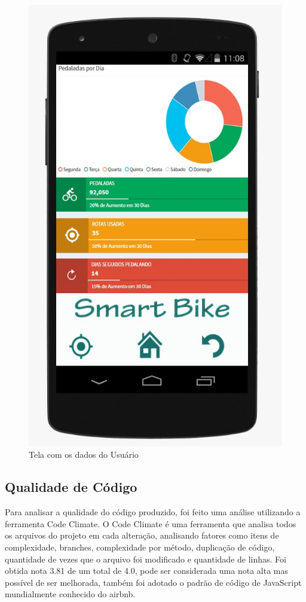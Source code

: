 	\graphicspath{{figuras/}}
	\begin{figure}[!htb]
	\centering
	\includegraphics[scale=0.40]{dashboard.jpeg}
	\caption{Tela com os dados do Usuário}
	\label{img:dados}
	\end{figure}
	
	\subsection{Qualidade de Código}
	Para analisar a qualidade do código produzido, foi feito uma análise utilizando a ferramenta Code Climate.
	O Code Climate é uma ferramenta que analisa todos os arquivos do projeto em cada
	alteração, analisando fatores como itens de complexidade, branches, complexidade
	por método, duplicação de código, quantidade de vezes que o arquivo foi modificado e
	quantidade de linhas.
	Foi obtida nota 3.81 de um total de 4.0, pode ser considerada uma nota alta mas
	possível de ser melhorada, também foi adotado o padrão de código de JavaScript mundialmente conhecido do airbnb.
	

